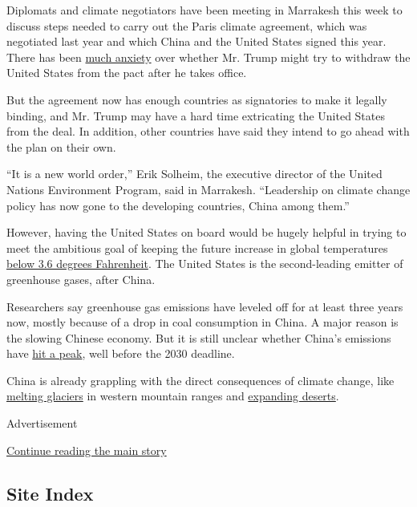 Diplomats and climate negotiators have been meeting in Marrakesh this
week to discuss steps needed to carry out the Paris climate agreement,
which was negotiated last year and which China and the United States
signed this year. There has been
\href{http://www.nytimes3xbfgragh.onion/2016/11/16/world/united-nations-climate-change-trump.html?_r=0}{much
anxiety} over whether Mr. Trump might try to withdraw the United States
from the pact after he takes office.

But the agreement now has enough countries as signatories to make it
legally binding, and Mr. Trump may have a hard time extricating the
United States from the deal. In addition, other countries have said they
intend to go ahead with the plan on their own.

``It is a new world order,'' Erik Solheim, the executive director of the
United Nations Environment Program, said in Marrakesh. ``Leadership on
climate change policy has now gone to the developing countries, China
among them.''

However, having the United States on board would be hugely helpful in
trying to meet the ambitious goal of keeping the future increase in
global temperatures \href{http://www.cop21.gouv.fr/en/why-2c/}{below 3.6
degrees Fahrenheit}. The United States is the second-leading emitter of
greenhouse gases, after China.

Researchers say greenhouse gas emissions have leveled off for at least
three years now, mostly because of a drop in coal consumption in China.
A major reason is the slowing Chinese economy. But it is still unclear
whether China's emissions have
\href{http://www.nytimes3xbfgragh.onion/2016/04/04/world/asia/china-climate-change-peak-carbon-emissions.html}{hit
a peak}, well before the 2030 deadline.

China is already grappling with the direct consequences of climate
change, like
\href{http://www.nytimes3xbfgragh.onion/2015/12/09/world/asia/chinese-glaciers-retreat-signals-trouble-for-asian-water-supply.html?_r=0}{melting
glaciers} in western mountain ranges and
\href{http://www.nytimes3xbfgragh.onion/interactive/2016/10/25/world/asia/china-climate-change-resettlement.html}{expanding
deserts}.

Advertisement

\protect\hyperlink{after-bottom}{Continue reading the main story}

\hypertarget{site-index}{%
\subsection{Site Index}\label{site-index}}

